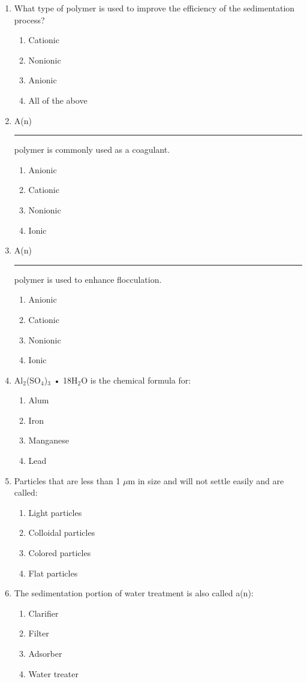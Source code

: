 \begin{enumerate}
\item  What type of polymer is used to improve the efficiency of the sedimentation
process?
\begin{enumerate}
\item Cationic
\item Nonionic
\item Anionic
\item All of the above
\end{enumerate}

\item A(n) \rule{2cm}{0.3pt} polymer is commonly used as a coagulant.
\begin{enumerate}
\item Anionic
\item Cationic
\item Nonionic
\item Ionic
\end{enumerate}


\item A(n) \rule{2cm}{0.3pt} polymer is used to enhance flocculation.
\begin{enumerate}
\item Anionic
\item Cationic
\item Nonionic
\item Ionic
\end{enumerate}

\item Al$_2$(SO$_4$)$_3$ • 18H$_2$O is the chemical formula for:
\begin{enumerate}
\item Alum
\item Iron
\item Manganese
\item Lead
\end{enumerate}

\item Particles that are less than 1 $\mu$m in size and will not settle easily and are called:
\begin{enumerate}
\item Light particles
\item Colloidal particles
\item Colored particles
\item Flat particles
\end{enumerate}

\item The sedimentation portion of water treatment is also called a(n):
\begin{enumerate}
\item Clarifier
\item Filter
\item Adsorber
\item Water treater
\end{enumerate}


\end{enumerate}
